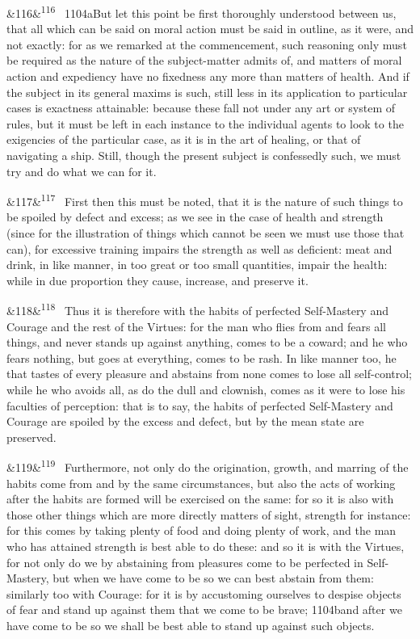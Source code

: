 \documentclass[12pt]{article}
\newcommand{\para}[1][]{\par\noindent\ifx&#1&\else\textsuperscript{\footnotesize #1}~\fi}
\begin{document}
\para[116] 1104aBut let this point be first thoroughly understood between us, that all which can be said on moral action must be said in outline, as it were, and not exactly: for as we remarked at the commencement, such reasoning only must be required as the nature of the subject-matter admits of, and matters of moral action and expediency have no fixedness any more than matters of health. And if the subject in its general maxims is such, still less in its application to particular cases is exactness attainable: because these fall not under any art or system of rules, but it must be left in each instance to the individual agents to look to the exigencies of the particular case, as it is in the art of healing, or that of navigating a ship. Still, though the present subject is confessedly such, we must try and do what we can for it.

\para[117] First then this must be noted, that it is the nature of such things to be spoiled by defect and excess; as we see in the case of health and strength (since for the illustration of things which cannot be seen we must use those that can), for excessive training impairs the strength as well as deficient: meat and drink, in like manner, in too great or too small quantities, impair the health: while in due proportion they cause, increase, and preserve it.

\para[118] Thus it is therefore with the habits of perfected Self-Mastery and Courage and the rest of the Virtues: for the man who flies from and fears all things, and never stands up against anything, comes to be a coward; and he who fears nothing, but goes at everything, comes to be rash. In like manner too, he that tastes of every pleasure and abstains from none comes to lose all self-control; while he who avoids all, as do the dull and clownish, comes as it were to lose his faculties of perception: that is to say, the habits of perfected Self-Mastery and Courage are spoiled by the excess and defect, but by the mean state are preserved.

\para[119] Furthermore, not only do the origination, growth, and marring of the habits come from and by the same circumstances, but also the acts of working after the habits are formed will be exercised on the same: for so it is also with those other things which are more directly matters of sight, strength for instance: for this comes by taking plenty of food and doing plenty of work, and the man who has attained strength is best able to do these: and so it is with the Virtues, for not only do we by abstaining from pleasures come to be perfected in Self-Mastery, but when we have come to be so we can best abstain from them: similarly too with Courage: for it is by accustoming ourselves to despise objects of fear and stand up against them that we come to be brave; 1104band after we have come to be so we shall be best able to stand up against such objects.
\end{document}
